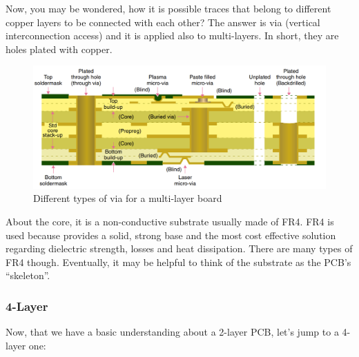\documentclass[final]{cubedoc}
\begin{document}
	Now, you may be wondered, how it is possible traces that belong to different copper layers to be connected with each other? The answer is via (vertical interconnection access) and it is applied also to multi-layers. In short, they are holes plated with copper.
	
	\begin{figure}[h!]
		\centering
		\includegraphics[width=\textwidth, height=.25\textheight]{assets/via.png}
		\caption{Different types of via for a multi-layer board \cite[p.4]{mitzner2011complete}}
	\end{figure}
	
	About the core, it is a non-conductive substrate usually made of FR4. FR4 is used because provides a solid, strong base and the most cost effective solution regarding dielectric strength, losses and heat dissipation. There are many types of FR4 though. Eventually, it may be helpful to think of the substrate as the PCB’s “skeleton”. 
	
	\subsubsection{4-Layer}
	Now, that we have a basic understanding about a 2-layer PCB, let’s jump to a 4-layer one:
	
\end{document}
